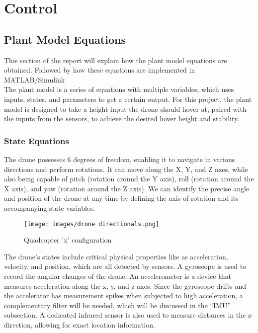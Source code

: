 \documentclass{article}
\begin{document}
\linespread{1.5}
\section{Control}
\subsection{Plant Model Equations}
This section of the report will explain how the plant model equations are obtained. Followed by how these equations are implemented in MATLAB/Simulink \\

The plant model is a series of equations with multiple variables, which uses inputs, states, and parameters to get a certain output. 
For this project, the plant model is designed to take a height input the drone should hover at, paired with the inputs from the sensors, to achieve the desired hover height and stability.

\subsubsection{State Equations}
The drone possesses 6 degrees of freedom, enabling it to navigate in various directions and perform rotations. It can move along the X, Y, and Z axes, while also being capable of pitch (rotation around the Y axis), roll (rotation around the X axis), and yaw (rotation around the Z axis). We can identify the precise angle and position of the drone at any time by defining the axis of rotation and its accompanying state variables.
\cite{Ferry}

\begin{figure}[H]
\begin{center}
    \texttt{[image: images/drone directionals.png]}
\end{center}
\caption{Quadcopter 'x' configuration}
\end{figure}

The drone's states include critical physical properties like as acceleration, velocity, and position, which are all detected by sensors. A gyroscope is used to record the angular changes of the drone. An accelerometer is a device that measures acceleration along the x, y, and z axes. Since the gyroscope drifts and the accelerator has measurement spikes when subjected to high acceleration, a complementary filter will be needed, which will be discussed in the “IMU” subsection. A dedicated infrared sensor is also used to measure distances in the z-direction, allowing for exact location information.
\end{document}
